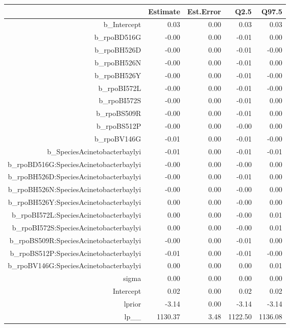 \begin{table}[ht]
\centering
\begin{tabular}{rrrrr}
  \hline
 & Estimate & Est.Error & Q2.5 & Q97.5 \\ 
  \hline
b\_Intercept & 0.03 & 0.00 & 0.03 & 0.03 \\ 
  b\_rpoBD516G & -0.00 & 0.00 & -0.01 & 0.00 \\ 
  b\_rpoBH526D & -0.00 & 0.00 & -0.01 & -0.00 \\ 
  b\_rpoBH526N & -0.00 & 0.00 & -0.01 & 0.00 \\ 
  b\_rpoBH526Y & -0.00 & 0.00 & -0.01 & -0.00 \\ 
  b\_rpoBI572L & -0.00 & 0.00 & -0.01 & -0.00 \\ 
  b\_rpoBI572S & -0.00 & 0.00 & -0.01 & 0.00 \\ 
  b\_rpoBS509R & -0.00 & 0.00 & -0.01 & 0.00 \\ 
  b\_rpoBS512P & -0.00 & 0.00 & -0.00 & 0.00 \\ 
  b\_rpoBV146G & -0.01 & 0.00 & -0.01 & -0.00 \\ 
  b\_SpeciesAcinetobacterbaylyi & -0.01 & 0.00 & -0.01 & -0.01 \\ 
  b\_rpoBD516G:SpeciesAcinetobacterbaylyi & -0.00 & 0.00 & -0.00 & 0.00 \\ 
  b\_rpoBH526D:SpeciesAcinetobacterbaylyi & -0.00 & 0.00 & -0.01 & 0.00 \\ 
  b\_rpoBH526N:SpeciesAcinetobacterbaylyi & -0.00 & 0.00 & -0.00 & 0.00 \\ 
  b\_rpoBH526Y:SpeciesAcinetobacterbaylyi & 0.00 & 0.00 & -0.00 & 0.00 \\ 
  b\_rpoBI572L:SpeciesAcinetobacterbaylyi & 0.00 & 0.00 & -0.00 & 0.01 \\ 
  b\_rpoBI572S:SpeciesAcinetobacterbaylyi & 0.00 & 0.00 & -0.00 & 0.01 \\ 
  b\_rpoBS509R:SpeciesAcinetobacterbaylyi & -0.00 & 0.00 & -0.01 & 0.00 \\ 
  b\_rpoBS512P:SpeciesAcinetobacterbaylyi & -0.01 & 0.00 & -0.01 & -0.00 \\ 
  b\_rpoBV146G:SpeciesAcinetobacterbaylyi & 0.00 & 0.00 & 0.00 & 0.01 \\ 
  sigma & 0.00 & 0.00 & 0.00 & 0.00 \\ 
  Intercept & 0.02 & 0.00 & 0.02 & 0.02 \\ 
  lprior & -3.14 & 0.00 & -3.14 & -3.14 \\ 
  lp\_\_ & 1130.37 & 3.48 & 1122.50 & 1136.08 \\ 
   \hline
\end{tabular}
\end{table}
